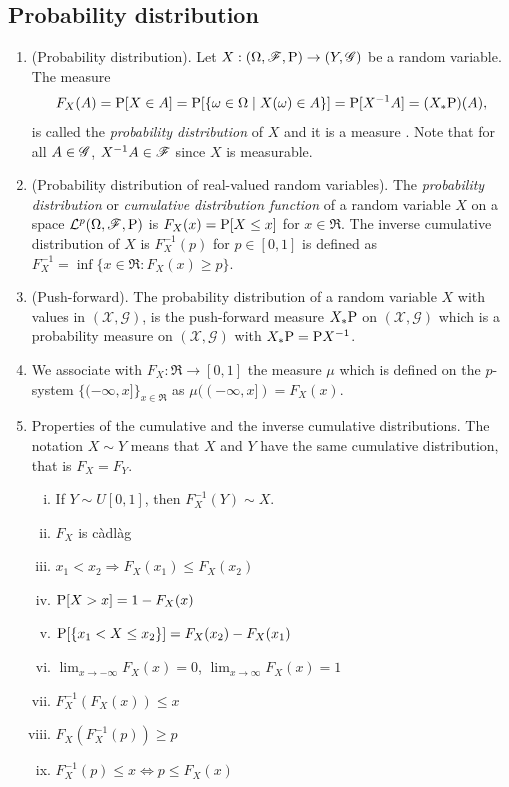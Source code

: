 \documentclass[a4paper,10pt]{scrbook}
\begin{document}
\subsection{Probability distribution}
\begin{enumerate} 
 
 \item (Probability distribution). Let $X:(\Omega,\mathscr{F},\mathrm{P}) \to (Y, \mathscr{G})$ be a random variable. The measure
 \[
  F_X(A) = \mathrm{P}[X\in A] = \mathrm{P}[\{\omega\in\Omega\mid X(\omega) \in A\}] = \mathrm{P}[X^{-1}A] = (X_*\mathrm{P})(A),
 \]
 is called the \textit{probability distribution} of $X$ and it is a measure . Note that for all $A\in\mathscr{G}$, $X^{-1}A\in\mathscr{F}$
 since $X$ is measurable. 
 \item \label{rv221088}
 (Probability distribution of real-valued random variables).
 The \textit{probability distribution} or \textit{cumulative distribution function} of a random variable $X$ on a space
 $\mathcal{L}^p(\Omega,\mathscr{F},\mathrm{P})$ is $F_X(x) = \mathrm{P}[X\leq x]$ for $x\in\Re$. The inverse cumulative
 distribution of $X$ is $F_X^{-1}(p)$ for $p\in[0,1]$ is defined as 
 $F_X^{-1}=\inf\{x\in\Re: F_X(x) \geq p\}$. 
 
 \item (Push-forward).
 \label{rv221089}
 The probability distribution of a random variable $X$ with values in $(\mathcal{X},\mathscr{G})$,
 is the push-forward measure $X_*\mathrm{P}$ on $(\mathcal{X},\mathscr{G})$ which is 
 a probability measure on $(\mathcal{X},\mathscr{G})$ with $X_*\mathrm{P} = \mathrm{P} X^{-1}$.
 
 
 \item 
 \label{rv221137}
 We associate with $F_X:\Re\to[0,1]$ the measure $\mu$ which is defined on 
 the $p$-system $\{(-\infty,x]\}_{x\in\Re}$ as $\mu((-\infty, x]) = F_X(x)$.
 \item
 \label{rv231132}
 Properties of the cumulative and the inverse cumulative distributions. The notation
 $X\sim Y$ means that $X$ and $Y$ have the same cumulative distribution, that is 
 $F_X = F_Y$.
    \begin{enumerate}[i.]
      \item If $Y\sim U[0,1]$, then $F_X^{-1}(Y) \sim X$.
      \item $F_X$ is c\`adl\`ag
      \item $x_1<x_2 \Rightarrow F_X(x_1) \leq F_X(x_2)$
      \item $\mathrm{P}[X>x] = 1 - F_X(x)$
      \item $\mathrm{P}[\{x_1 < X \leq x_2\}] = F_X(x_2) - F_X(x_1)$
      \item $\lim_{x\to-\infty}F_X(x) = 0$, $\lim_{x\to\infty}F_X(x) = 1$
      \item $F_X^{-1}(F_X(x)) \leq x$
      \item $F_X(F_X^{-1}(p)) \geq p$
      \item $F_X^{-1}(p) \leq x \Leftrightarrow p \leq F_X(x)$
    \end{enumerate}
\end{enumerate}
\end{document}
